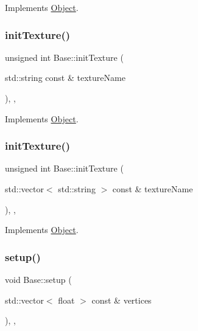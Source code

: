 Implements \hyperlink{classObject_ab1ec4e4c64ac1564d9ccad7655cfaf82}{Object}.

\mbox{\label{classBase_ae1e3b63d1e2d374e1dc49a9160717cfe}} 
\subsubsection{\texorpdfstring{init\+Texture()}{initTexture()}\hspace{0.1cm}{\footnotesize\ttfamily [1/2]}}
{\footnotesize\ttfamily unsigned int Base\+::init\+Texture (\begin{DoxyParamCaption}\item[{std\+::string const \&}]{texture\+Name }\end{DoxyParamCaption})\hspace{0.3cm}{\ttfamily [override]}, {\ttfamily [protected]}, {\ttfamily [virtual]}}



Implements \hyperlink{classObject_a12b8309292a39b028d5a7b1dfca98cb1}{Object}.

\mbox{\label{classBase_ae8bcd2edd2c191d58109502792a067ab}} 
\subsubsection{\texorpdfstring{init\+Texture()}{initTexture()}\hspace{0.1cm}{\footnotesize\ttfamily [2/2]}}
{\footnotesize\ttfamily unsigned int Base\+::init\+Texture (\begin{DoxyParamCaption}\item[{std\+::vector$<$ std\+::string $>$ const \&}]{texture\+Name }\end{DoxyParamCaption})\hspace{0.3cm}{\ttfamily [override]}, {\ttfamily [protected]}, {\ttfamily [virtual]}}



Implements \hyperlink{classObject_ac18935ff7831cb35dc462b581d2ccf3c}{Object}.

\mbox{\label{classBase_a57945f86e82faccbd6147f355ed17407}} 
\subsubsection{\texorpdfstring{setup()}{setup()}}
{\footnotesize\ttfamily void Base\+::setup (\begin{DoxyParamCaption}\item[{std\+::vector$<$ float $>$ const \&}]{vertices }\end{DoxyParamCaption})\hspace{0.3cm}{\ttfamily [override]}, {\ttfamily [protected]}, {\ttfamily [virtual]}}



